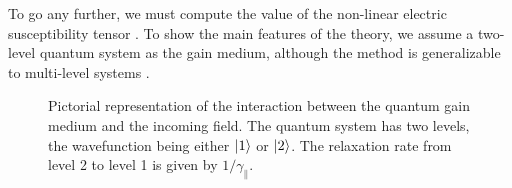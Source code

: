 To go any further, we must compute the value of the non-linear electric
susceptibility tensor \cite{BOY2003}. 
To show the main features of the theory, we assume a two-level quantum 
system as the gain medium, although the method is generalizable to 
multi-level systems \cite[\S2.3]{GE2010b}. 

\begin{figure}
 \begin{center}
 \end{center}
 \caption[Pictorial representation of the quantum gain medium]
	 {Pictorial representation of the interaction between the
	 quantum gain medium and the incoming field. The quantum system has 
	 two levels, the wavefunction being either $\Ket{1}$ or $\Ket{2}$. The relaxation
	 rate from level 2 to level 1 is given by $1/\gamma_\parallel$.}
 \label{fig:active.salt.twoLevelSystem}
\end{figure}

